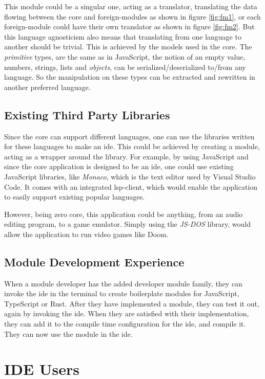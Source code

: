 This module could be a singular one, acting as a translator, translating the
data flowing between the core and foreign-modules as shown in figure
\ref{fig:fm1}, or each foreign-module could have their own translator as shown
in figure \ref{fig:fm2}. But this language agnosticism also means that
translating from one language to another should be trivial. This is achieved by
the models used in the core. The \textit{primitive} types, are the same as in
JavaScript, the notion of an empty value, numbers, strings, lists and
\textit{objects}, can be serialized/deserialized to/from any language. So the
manipulation on these types can be extracted and rewritten in another preferred
language.

\subsection{Existing Third Party Libraries}

Since the core can support different languages, one can use the libraries
written for these languages to make an \gls{ide}. This could be achieved by
creating a module, acting as a wrapper around the library. For example, by
using JavaScript and since the core application is designed to be an \gls{ide},
one could use existing JavaScript libraries, like \textit{Monaco}, which is the
text editor used by Visual Studio Code. It comes with an integrated
\gls{lsp}-client, which would enable the application to easily support existing
popular languages.

However, being zero core, this application could be anything, from an audio
editing program, to a game emulator. Simply using the \textit{JS-DOS} library,
would allow the application to run video games like Doom.

\subsection{Module Development Experience}

When a module developer has the added developer module family, they can invoke
the \gls{ide} in the terminal to create boilerplate modules for JavaScript,
TypeScript or Rust. 
After they have implemented a module, they can test it out, again by invoking
the \gls{ide}. When they are satisfied with their implementation, they can add
it to the compile time configuration for the \gls{ide}, and compile it. They can
now use the module in the \gls{ide}.

\section{IDE Users}

